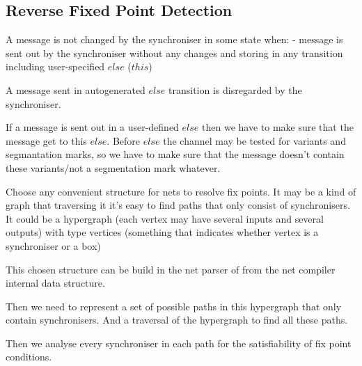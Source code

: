     \subsection{Reverse Fixed Point Detection}
A message is not changed by the synchroniser in some state when:
- message is sent out by the synchroniser without any changes and storing in any transition including user-specified $else$ ($this$)

A message sent in autogenerated $else$ transition is disregarded by the synchroniser.

If a message is sent out in a user-defined $else$ then we have to make sure that the message get to this $else$. Before $else$ the channel may be tested for variants and segmantation marks, so we have to make sure that the message doesn't contain these variants/not a segmentation mark whatever.


Choose any convenient structure for nets to resolve fix points. It may be a kind of graph that traversing it it's easy to find paths that only consist of synchronisers.
It could be a hypergraph (each vertex may have several inputs and several outputs) with type vertices (something that indicates whether vertex is a synchroniser or a box)

This chosen structure can be build in the net parser of from the net compiler internal data structure.

Then we need to represent a set of possible paths in this hypergraph that only contain synchronisers. And a traversal of the hypergraph to find all these paths.

Then we analyse every synchroniser in each path for the satisfiability of fix point conditions.
